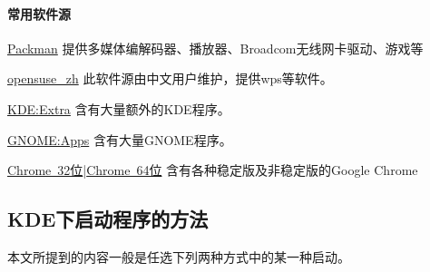 \documentclass[12pt,openany]{book}
\begin{document}
\paragraph{常用软件源}\label{repo}

\begin{compactdesc}
 \item[\href{http://mirrors.hust.edu.cn/packman/suse/openSUSE_13.2/}{Packman}]
 提供多媒体编解码器、播放器、Broadcom无线网卡驱动、游戏等
 \item[\href{http://download.opensuse.org/repositories/home:/opensuse_zh/openSUSE_13.2/}{opensuse\_zh}]
 此软件源由中文用户维护，提供wps等软件。
 \item[\href{http://download.opensuse.org/repositories/KDE:/Extra/openSUSE_13.2/}{KDE:Extra}]
 含有大量额外的KDE程序。
 \item[\href{http://download.opensuse.org/repositories/GNOME:/Apps/openSUSE_13.2/}{GNOME:Apps}]
 含有大量GNOME程序。
 \item[\href{http://dl.google.com/linux/chrome/rpm/stable/i386}{Chrome~32位}|\href{http://dl.google.com/linux/chrome/rpm/stable/x86_64}{Chrome~64位}] 含有各种稳定版及非稳定版的Google Chrome
\end{compactdesc}
\subsection{KDE下启动程序的方法}
本文所提到的内容一般是任选下列两种方式中的某一种启动。
\end{document}
